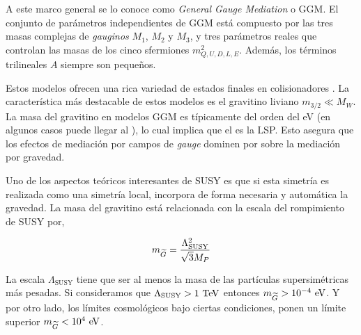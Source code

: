 A este marco general se lo conoce como \emph{General Gauge Mediation} o GGM. El
conjunto de parámetros independientes de GGM está compuesto por las tres masas
complejas de \emph{gauginos} $M_1$, $M_2$ y $M_3$, y tres parámetros reales que
controlan las masas de los cinco sfermiones $m^2_{Q,U,D,L,E}$. Además, los términos
trilineales $A$ siempre son pequeños.

Estos modelos ofrecen una rica variedad de estados finales en colisionadores
\cite{0911.4130}. La característica más destacable de estos modelos es el
gravitino liviano $m_{3/2} \ll M_W$. La masa del gravitino en modelos
GGM es típicamente del orden del eV (en algunos casos puede llegar al \gev), lo
cual implica que el {\gravino} es la LSP. Esto asegura que los efectos de
mediación por campos de \emph{gauge} dominen por sobre la mediación por gravedad.

Uno de los aspectos teóricos interesantes de SUSY es que si esta simetría es
realizada como una simetría local, incorpora de forma necesaria y automática la
gravedad.
La masa del gravitino está relacionada con la escala del rompimiento de SUSY por,

\begin{equation}
  m_{\widetilde{G}} = \frac{\Lambda^2_{\text{SUSY}}}{\sqrt{3}M_P}
\end{equation}

La escala $\Lambda_{\text{SUSY}}$ tiene que ser al menos la masa de las
partículas supersimétricas más pesadas. Si consideramos que
$\Lambda_{\text{SUSY}} > 1 \tev$ entonces $m_{\gravino} > 10^{-4} \eV$.
Y por otro lado, los límites cosmológicos \cite{PhysRevLett.48.223,Moroi:1993mb}
bajo ciertas condiciones, ponen un límite superior $m_{\gravino} < 10^4 \eV$.

